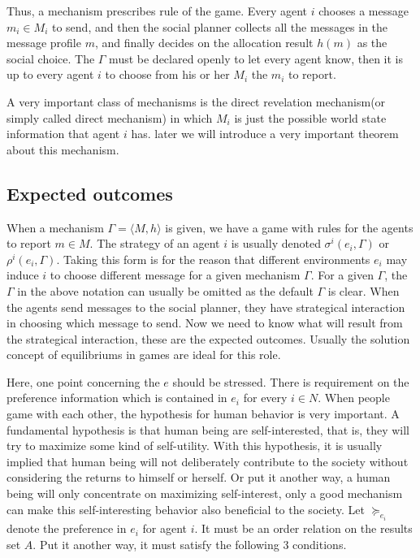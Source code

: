 Thus, a mechanism prescribes rule of the game. Every agent $i$ chooses a message
$m_i \in M_i$ to send, and then the social planner collects all the messages in the message profile $m$, and finally decides on the allocation result $h(m)$ as the social choice. The $\Gamma$ must be declared openly to let every agent know, then it is up to every agent $i$ to choose from his or her $M_i$ the $m_i$ to report.

A very important class of mechanisms is the direct revelation
mechanism(or simply called direct mechanism) in which $M_i$ is just the possible world state information 
that agent $i$ has.  later we will introduce a very important theorem
about this mechanism.
\subsection{Expected outcomes}

When a mechanism $\Gamma=\langle M, h\rangle$ is given, we have a game
with rules for the agents to report $m \in M$. The strategy of an
agent $i$ is usually denoted $\sigma^i(e_i,\Gamma)$ or $\rho^i(e_i,\Gamma)$. Taking this
form is for the reason that different environments $e_i$ may induce
$i$ to choose different message for a given mechanism $\Gamma$. For a given $\Gamma$, the $\Gamma$ in the above notation can usually
be omitted as the default $\Gamma$ is clear.
When the agents send messages to the social planner, they have strategical interaction in choosing which message to send. Now we need to know what will result from the strategical interaction, these are the expected outcomes. Usually the solution concept of equilibriums in games are ideal for this role.

Here, one point concerning the $e$ should be stressed.  There is requirement on the preference
information which is contained in $e_i$ for every $i \in N$.
When people game with each other, the hypothesis for human behavior is
very important. A fundamental hypothesis is that human being are
self-interested, that is, they will try to maximize some kind of
self-utility. With this hypothesis, it is usually implied that human
being will not deliberately contribute to the society without
considering the returns to himself or herself. Or put it another way,
a human being will only concentrate on maximizing self-interest, only
a good mechanism can make this self-interesting behavior also
beneficial to the society. Let $\succeq_{e_i}$ denote the preference
in $e_i$ for agent $i$. It must be an order relation on the results
set $A$. Put it another way, it must satisfy the following 3
conditions.


